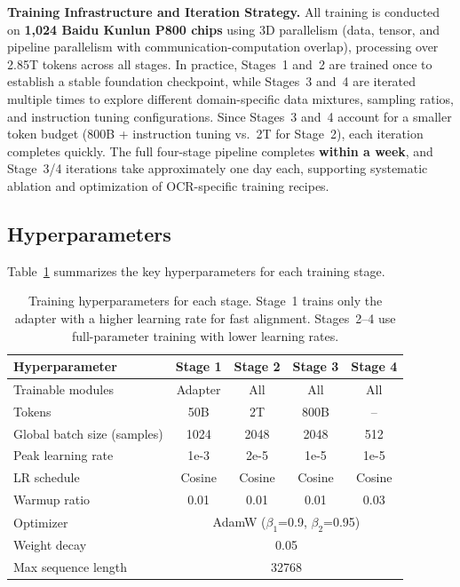 \documentclass[dvipsnames]{article}
\begin{document}
\textbf{Training Infrastructure and Iteration Strategy.}
All training is conducted on \textbf{1,024 Baidu Kunlun P800 chips} using 3D parallelism (data, tensor, and pipeline parallelism with communication-computation overlap), processing over 2.85T tokens across all stages. In practice, Stages~1 and~2 are trained once to establish a stable foundation checkpoint, while Stages~3 and~4 are iterated multiple times to explore different domain-specific data mixtures, sampling ratios, and instruction tuning configurations. Since Stages~3 and~4 account for a smaller token budget (800B + instruction tuning vs.\ 2T for Stage~2), each iteration completes quickly. The full four-stage pipeline completes \textbf{within a week}, and Stage~3/4 iterations take approximately one day each, supporting systematic ablation and optimization of OCR-specific training recipes.

\subsection{Hyperparameters}

Table~\ref{tab:training_hyperparams} summarizes the key hyperparameters for each training stage.

\begin{table}[H]
\centering
\small
\setlength{\tabcolsep}{4pt}
\begin{tabular}{l|cccc}
\toprule
\textbf{Hyperparameter} & \textbf{Stage 1} & \textbf{Stage 2} & \textbf{Stage 3} & \textbf{Stage 4} \\
\midrule
Trainable modules & Adapter & All & All & All \\
Tokens & 50B & 2T & 800B & -- \\
Global batch size (samples) & 1024 & 2048 & 2048 & 512 \\
Peak learning rate & 1e-3 & 2e-5 & 1e-5 & 1e-5 \\
LR schedule & Cosine & Cosine & Cosine & Cosine \\
Warmup ratio & 0.01 & 0.01 & 0.01 & 0.03 \\
Optimizer & \multicolumn{4}{c}{AdamW ($\beta_1$=0.9, $\beta_2$=0.95)} \\
Weight decay & \multicolumn{4}{c}{0.05} \\
Max sequence length & \multicolumn{4}{c}{32768} \\
\bottomrule
\end{tabular}
\caption{Training hyperparameters for each stage. Stage~1 trains only the adapter with a higher learning rate for fast alignment. Stages~2--4 use full-parameter training with lower learning rates.}
\label{tab:training_hyperparams}
\end{table}
\end{document}
